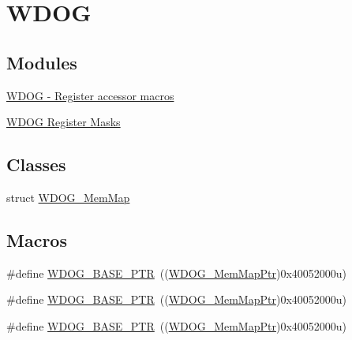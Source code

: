 \hypertarget{group___w_d_o_g___peripheral}{}\section{W\+D\+OG}
\label{group___w_d_o_g___peripheral}
\subsection*{Modules}
\begin{DoxyCompactItemize}
\item 
\hyperlink{group___w_d_o_g___register___accessor___macros}{W\+D\+O\+G -\/ Register accessor macros}
\item 
\hyperlink{group___w_d_o_g___register___masks}{W\+D\+O\+G Register Masks}
\end{DoxyCompactItemize}
\subsection*{Classes}
\begin{DoxyCompactItemize}
\item 
struct \hyperlink{struct_w_d_o_g___mem_map}{W\+D\+O\+G\+\_\+\+Mem\+Map}
\end{DoxyCompactItemize}
\subsection*{Macros}
\begin{DoxyCompactItemize}
\item 
\#define \hyperlink{group___w_d_o_g___peripheral_ga72fb27c7bc1ae124f180d8f2c7b9fa79}{W\+D\+O\+G\+\_\+\+B\+A\+S\+E\+\_\+\+P\+TR}~((\hyperlink{group___w_d_o_g___peripheral_gaed99974fa14a19f21a8770728ff09af3}{W\+D\+O\+G\+\_\+\+Mem\+Map\+Ptr})0x40052000u)
\item 
\#define \hyperlink{group___w_d_o_g___peripheral_ga72fb27c7bc1ae124f180d8f2c7b9fa79}{W\+D\+O\+G\+\_\+\+B\+A\+S\+E\+\_\+\+P\+TR}~((\hyperlink{group___w_d_o_g___peripheral_gaed99974fa14a19f21a8770728ff09af3}{W\+D\+O\+G\+\_\+\+Mem\+Map\+Ptr})0x40052000u)
\item 
\#define \hyperlink{group___w_d_o_g___peripheral_ga72fb27c7bc1ae124f180d8f2c7b9fa79}{W\+D\+O\+G\+\_\+\+B\+A\+S\+E\+\_\+\+P\+TR}~((\hyperlink{group___w_d_o_g___peripheral_gaed99974fa14a19f21a8770728ff09af3}{W\+D\+O\+G\+\_\+\+Mem\+Map\+Ptr})0x40052000u)
\end{DoxyCompactItemize}
